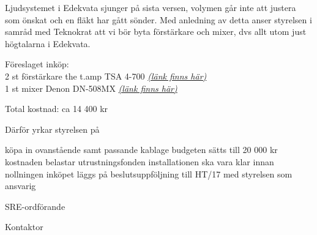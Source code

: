 \documentclass[../_main/handlingar.tex]{subfiles}
\def\sreordf{Pontus Landgren}
\begin{document}
Ljudsystemet i Edekvata sjunger på sista versen, volymen går inte att justera som önskat och en fläkt har gått sönder. Med anledning av detta anser styrelsen i samråd med Teknokrat att vi bör byta förstärkare och mixer, dvs allt utom just högtalarna i Edekvata.  

Föreslaget inköp:\\ 
2 st förstärkare the t.amp TSA 4-700 \href{https://www.thomann.de/se/the_tamp_tsa_4700.htm}{\textit{(länk finns här)}}\\
1 st mixer Denon DN-508MX \href{https://www.thomann.de/se/denon_dn_508mx.htm}{\textit{(länk finns här)}}

Total kostnad: ca 14 400 kr

Därför yrkar styrelsen på

\begin{attsatser}
    \att köpa in ovanstående samt passande kablage
    \att budgeten sätts till 20 000 kr 
    \att kostnaden belastar utrustningsfonden
    \att installationen ska vara klar innan nollningen
    \att inköpet läggs på beslutsuppföljning till HT/17 med styrelsen som ansvarig 
    
\end{attsatser}

\begin{signatures}{2}
    \ist
    \signature{\sreordf}{SRE-ordförande}
    \signature{Johan Karlberg}{Kontaktor}
\end{signatures}
\end{document}
